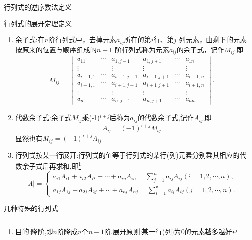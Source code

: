 \documentclass[8pt a4paper, oneside, UTF8]{ctexbook}
\begin{document}
\begin{sloppypar}
\begin{defn}{行列式的逆序数法定义}{}
    \end{defn}
    \begin{defn}{行列式的展开定理定义}{}
        \begin{enumerate}
            \item 余子式:在$n$阶行列式中，去掉元素$a_{ij}$所在的第$i$行、第$j$ 列元素，由剩下的元素按原来的位置与顺序组成的$n-1$ 阶行列式称为元素$a_{ij}$的余子式，记作$M_{ij}$,即
                  $$
                      \begin{gathered}M_{ij}=\begin{vmatrix}a_{11}&\cdots&a_{1,j-1}&a_{1,j+1}&\cdots&a_{1n}\\\vdots&&\vdots&\vdots&&\vdots\\a_{i-1,1}&\cdots&a_{i-1,j-1}&a_{i-1,j+1}&\cdots&a_{i-1,n}\\a_{i+1,1}&\cdots&a_{i+1,j-1}&a_{i+1,j+1}&\cdots&a_{i+1,n}\\\vdots&&\vdots&\vdots&&\vdots\\a_{n!}&\cdots&a_{n,j-1}&a_{n,j+1}&\cdots&a_{nn}\end{vmatrix}.\end{gathered}
                  $$
            \item 代数余子式:余子式$M_{ij}$乘(-1)$^{i+j}$后称为$a_{ij}$的代数余子式,记作$A_{ij}$,即$$A_{ij}=(-1)^{i+j}M_{ij}$$显然也有$M_{ij}=(-1)^{i+j}A_{ij}$
            \item 行列式按某一行展开:行列式的值等于行列式的某行(列)元素分别乘其相应的代数余子式后再求和,即\footnote{目的:降阶,即$n$阶降成$n$个$n-1$阶.展开原则:某一行(列)为$0$的元素越多越好}
                  $$
                      |A|=\begin{cases}a_{i1}A_{i1}+a_{i2}A_{i2}+\cdots+a_{in}A_{in}=\sum_{j=1}^{n}a_{ij}A_{ij}\left(i=1,2,\cdots,n\right),\\a_{1j}A_{1j}+a_{2j}A_{2j}+\cdots+a_{nj}A_{nj}=\sum_{i=1}^{n}a_{ij}A_{ij}\left(j=1,2,\cdots,n\right).\end{cases}
                  $$
        \end{enumerate}
    \end{defn}
    \begin{criterion}{几种特殊的行列式}{}
        \begin{enumerate}

\end{enumerate}
\end{criterion}
\end{sloppypar}
\end{document}
